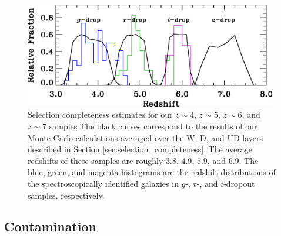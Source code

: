\documentclass[]{pasj01}
\begin{document}
\begin{figure}
 \begin{center}
  \includegraphics[width=11cm]{completeness.eps} 
 \end{center}
\caption{Selection completeness estimates for our 
$z \sim 4$, $z \sim 5$, $ z \sim 6$, and $z \sim 7$ samples 
The black curves correspond to 
the results of our Monte Carlo calculations 
averaged over the W, D, and  UD layers 
described in Section \ref{sec:selection_completeness}. 
The average redshifts of these samples are roughly $3.8$, $4.9$, $5.9$, and $6.9$. 
The blue, green, and magenta histograms are 
the redshift distributions of the spectroscopically identified galaxies  
in $g$-, $r$-, and $i$-dropout samples, respectively. 
}\label{fig:completeness}
\end{figure}



\subsection{Contamination} \label{sec:contaminations}
\end{document}
